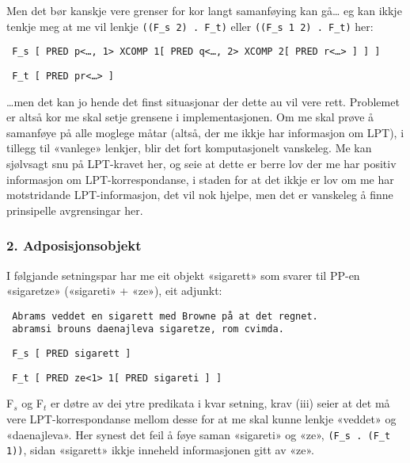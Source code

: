 \documentclass[11pt,a4paper,oneside,draft]{book}
\begin{document}
Men det bør kanskje vere grenser for kor langt samanføying kan gå… eg
kan ikkje tenkje meg at me vil lenkje \texttt{((F\_s 2) . F\_t)} eller \texttt{((F\_s 1 2) . F\_t)} her:

\begin{verbatim}
 F_s [ PRED p<…, 1> XCOMP 1[ PRED q<…, 2> XCOMP 2[ PRED r<…> ] ] ]
\end{verbatim}


\begin{verbatim}
 F_t [ PRED pr<…> ]
\end{verbatim}


\ldots{}men det kan jo hende det finst situasjonar der dette au vil vere
rett. Problemet er altså kor me skal setje grensene i
implementasjonen. Om me skal prøve å samanføye på alle moglege måtar
(altså, der me ikkje har informasjon om LPT), i tillegg til «vanlege»
lenkjer, blir det fort komputasjonelt vanskeleg. Me kan sjølvsagt snu
på LPT-kravet her, og seie at dette er berre lov der me har positiv
informasjon om LPT-korrespondanse, i staden for at det ikkje er lov om
me har motstridande LPT-informasjon, det vil nok hjelpe, men det er
vanskeleg å finne prinsipelle avgrensingar her. 
\subsubsection{2. Adposisjonsobjekt}
\label{sec-3.6.4.2}


I følgjande setningspar har me eit objekt «sigarett» som svarer til
PP-en «sigaretze» («sigareti» + «ze»), eit adjunkt:

\begin{verbatim}
 Abrams veddet en sigarett med Browne på at det regnet.
 abramsi brouns daenajleva sigaretze, rom cvimda.
\end{verbatim}


\begin{verbatim}
 F_s [ PRED sigarett ]
\end{verbatim}


\begin{verbatim}
 F_t [ PRED ze<1> 1[ PRED sigareti ] ]
\end{verbatim}


F$_s$ og F$_t$ er døtre av dei ytre predikata i kvar setning, krav (iii)
seier at det må vere LPT-korrespondanse mellom desse for at me skal
kunne lenkje «veddet» og «daenajleva».  Her synest det feil å føye
saman «sigareti» og «ze», \texttt{(F\_s . (F\_t 1))}, sidan «sigarett» ikkje
inneheld informasjonen gitt av «ze».
\end{document}
